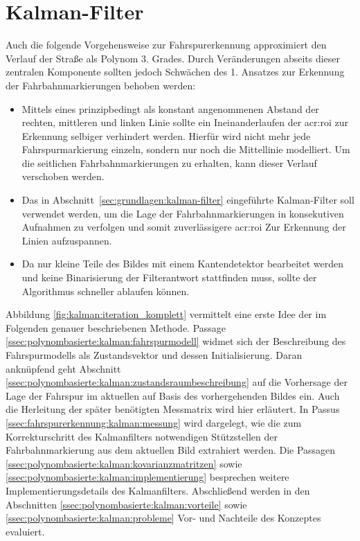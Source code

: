 \section{Kalman-Filter \dcsecondauthorshort}
\label{sec:fahrspurerkennung_kalman}
Auch die folgende Vorgehensweise zur Fahrspurerkennung approximiert den Verlauf der Straße als Polynom 3. Grades. Durch Veränderungen abseits dieser zentralen Komponente sollten jedoch Schwächen des 1. Ansatzes zur Erkennung der Fahrbahnmarkierungen behoben werden:
\begin{itemize}
\item Mittels eines prinzipbedingt als konstant angenommenen Abstand der rechten, mittleren und linken Linie sollte ein \glqq Ineinanderlaufen\grqq{} der \gls{acr:roi}
zur Erkennung selbiger verhindert werden. Hierfür wird nicht mehr jede Fahrspurmarkierung einzeln, sondern nur noch die Mittellinie modelliert. Um die seitlichen Fahrbahnmarkierungen zu erhalten, kann dieser Verlauf verschoben werden.
\item Das in Abschnitt~\ref{sec:grundlagen:kalman-filter} eingeführte Kalman-Filter soll verwendet werden, um die Lage der Fahrbahnmarkierungen in konsekutiven Aufnahmen zu verfolgen und somit zuverlässigere \gls{acr:roi} Zur Erkennung der Linien aufzuspannen.
\item Da nur kleine Teile des Bildes mit einem Kantendetektor bearbeitet werden und keine Binarisierung der Filterantwort stattfinden muss, sollte der Algorithmus schneller ablaufen können.
\end{itemize}
Abbildung \ref{fig:kalman:iteration_komplett} vermittelt eine erste Idee der im Folgenden genauer beschriebenen Methode.
Passage \ref{ssec:polynombasierte:kalman:fahrspurmodell} widmet sich der Beschreibung des Fahrspurmodells als Zustandsvektor und dessen Initialisierung. Daran anknüpfend geht Abschnitt \ref{ssec:polynombasierte:kalman:zustandsraumbeschreibung} auf die Vorhersage der Lage der Fahrspur im aktuellen auf Basis des vorhergehenden Bildes ein. Auch die Herleitung der später benötigten Messmatrix wird hier erläutert.
In Passus \ref{ssec:fahrspurerkennung:kalman:messung} wird dargelegt, wie die zum Korrekturschritt des Kalmanfilters notwendigen Stützstellen der Fahrbahnmarkierung aus dem aktuellen Bild extrahiert werden. Die Passagen \ref{ssec:polynombasierte:kalman:kovarianzmatritzen} sowie \ref{ssec:polynombasierte:kalman:implementierung} besprechen weitere Implementierungsdetails des Kalmanfilters. Abschließend werden in den Abschnitten \ref{ssec:polynombasierte:kalman:vorteile} sowie \ref{ssec:polynombasierte:kalman:probleme} Vor- und Nachteile des Konzeptes evaluiert.

